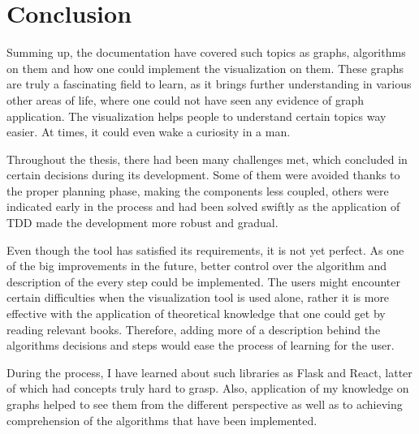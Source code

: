 \chapter{Conclusion} %
\label{ch:sum}

Summing up, the documentation have covered such topics as graphs, algorithms on them and how one could implement the visualization on them. These graphs are truly a fascinating field to learn, as it brings further understanding in various other areas of life, where one could not have seen any evidence of graph application. 
The visualization helps people to understand certain topics way easier. At times, it could even wake a curiosity in a man.

Throughout the thesis, there had been many challenges met, which concluded in certain decisions during its development. Some of them were avoided thanks to the proper planning phase, making the components less coupled, others were indicated early in the process and had been solved swiftly as the application of TDD made the development more robust and gradual.

Even though the tool has satisfied its requirements, it is not yet perfect. As one of the big improvements in the future, better control over the algorithm and description of the every step could be implemented. The users might encounter certain difficulties when the visualization tool is used alone, rather it is more effective with the application of theoretical knowledge that one could get by reading relevant books. Therefore, adding more of a description behind the algorithms decisions and steps would ease the process of learning for the user.

During the process, I have learned about such libraries as Flask and React, latter of which had concepts truly hard to grasp. Also, application of my knowledge on graphs helped to see them from the different perspective as well as to achieving comprehension of the algorithms that have been implemented.
